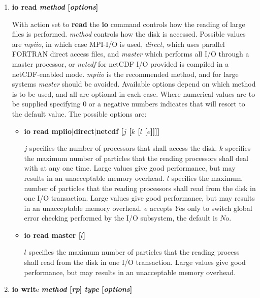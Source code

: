 \begin{enumerate}
\begin{enumerate}
\item {\bf io read {\em method} [{\em options}]}

With action set to {\bf read} the {\bf io} command controls how
the reading of large files is performed.  {\em method} controls
how the disk is accessed.  Possible values are {\em mpiio},
in which case MPI-I/O is used, {\em direct}, which uses
parallel FORTRAN direct access files, and {\em master} which
performs all I/O through a master processor, or {\em netcdf}
for netCDF I/O provided \D is compiled in a netCDF-enabled mode.
{\em mpiio} is the recommended method, and for large systems
{\em master} should be avoided.  Available options depend
on which method is to be used, and all are optional in each
case.  Where numerical values are to be supplied specifying
0 or a negative numbers indicates that \D will resort to
the default value.  The possible options are:

\begin{itemize}
\item {\bf io read mpiio$|$direct$|$netcdf [$j$ [$k$ [$l$ [$e$]]]]}

$j$ specifies the number of processors that shall access
the disk.  $k$ specifies the maximum number of particles
that the reading processors shall deal with at any one time.
Large values give good performance, but may results in an
unacceptable memory overhead.  $l$ specifies the maximum
number of particles that the reading processors shall
read from the disk in one I/O transaction.  Large values
give good performance, but may results in an unacceptable
memory overhead.  $e$ accepts $Y$es only to switch global
error checking performed by the I/O subsystem, the default
is $N$o.

\item {\bf io read master [$l$]}

$l$ specifies the maximum number of particles that the
reading process shall read from the disk in one I/O
transaction.  Large values give good performance, but may
results in an unacceptable memory overhead.
\end{itemize}

\item {\bf io writ}e {\bf{\em method} [{\em rp}] {\em type} [{\em options}]}


\end{enumerate}
\end{enumerate}
